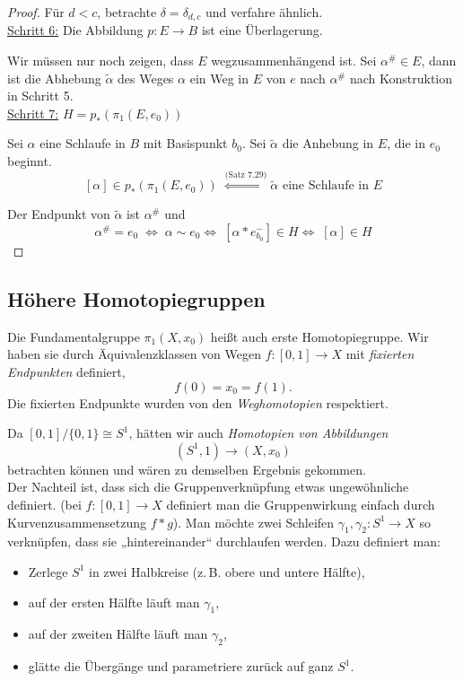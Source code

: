 \documentclass[fleqn, 12pt, letterpaper]{article}
\begin{document}
\begin{proof}
Für \( d < c \), betrachte \( \delta = \delta_{d,c} \) und verfahre ähnlich.\\

\underline{Schritt 6:} {Die Abbildung \( p \colon E \to B \) ist eine Überlagerung.}

Wir müssen nur noch zeigen, dass \( E \) wegzusammenhängend ist. Sei \( \alpha^\# \in E \), dann ist die Abhebung \( \tilde{\alpha} \) des Weges \( \alpha \) ein Weg in \( E \) von \( e \) nach \( \alpha^\# \) nach Konstruktion in Schritt 5.\\

\underline{Schritt 7:}
\(
H = p_* \left( \pi_1(E, e_0) \right)
\)

Sei \( \alpha \) eine Schlaufe in \( B \) mit Basispunkt \( b_0 \). Sei \( \tilde{\alpha} \) die Anhebung in \( E \), die in \( e_0 \) beginnt.
\[
[\alpha] \in p_*\left( \pi_1(E, e_0) \right) \; \overset{\text{(Satz 7.29)}}\Longleftrightarrow \tilde{\alpha} \text{ eine Schlaufe in } E
\]

Der Endpunkt von \( \tilde{\alpha} \) ist \( \alpha^\# \) und
\[
\alpha^\# = e_0 \; \Leftrightarrow \; \alpha \sim e_0 
\Leftrightarrow \; \left[ \alpha \ast e_{b_0}^- \right] \in H 
\Leftrightarrow \; \left[ \alpha \right] \in H
\]
\end{proof}

\subsection{Höhere Homotopiegruppen}

Die {Fundamentalgruppe} \( \pi_1(X, x_0) \) heißt auch {erste Homotopiegruppe}. Wir haben sie durch Äquivalenzklassen von Wegen \( f: [0,1] \to X \) mit \emph{fixierten Endpunkten} definiert,
\[
f(0) = x_0 = f(1).
\]
Die fixierten Endpunkte wurden von den \emph{Weghomotopien} respektiert.

Da \([0,1]/\{0,1\} \cong S^1\), hätten wir auch \emph{Homotopien von Abbildungen}
\[
(S^1, 1) \longrightarrow (X, x_0)
\]
betrachten können und wären zu demselben Ergebnis gekommen.\\

Der Nachteil ist, dass sich die Gruppenverknüpfung etwas ungewöhnliche definiert. (bei $f:[0,1]\to X$ definiert man die Gruppenwirkung einfach durch Kurvenzusammensetzung $f*g$). Man möchte zwei Schleifen \( \gamma_1, \gamma_2 : S^1 \to X \) so verknüpfen, dass sie „hintereinander“ durchlaufen werden. Dazu definiert man:

\begin{itemize}
  \item Zerlege \( S^1 \) in zwei Halbkreise (z.\,B. obere und untere Hälfte),
  \item auf der ersten Hälfte läuft man \( \gamma_1 \),
  \item auf der zweiten Hälfte läuft man \( \gamma_2 \),
  \item glätte die Übergänge und parametriere zurück auf ganz \( S^1 \).
\end{itemize}
\end{document}
